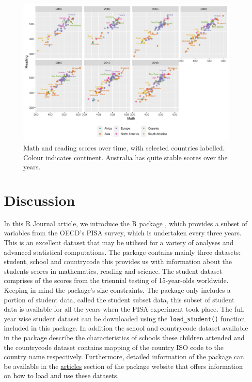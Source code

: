 \begin{Schunk}
\begin{figure}
\includegraphics[width=1\linewidth]{learningtower_files/figure-latex/facet-time-1} \caption[Math and reading scores over time, with selected countries labelled]{Math and reading scores over time, with selected countries labelled. Colour indicates continent. Australia has quite stable scores over the years.}\label{fig:facet-time}
\end{figure}
\end{Schunk}

\hypertarget{discussion}{%
\section{Discussion}\label{discussion}}

In this R Journal article, we introduce the R package
, which provides a subset of variables from the
OECD's PISA survey, which is undertaken every three years. This is an
excellent dataset that may be utilised for a variety of analyses and
advanced statistical computations. The package contains mainly three
datasets: student, school and countrycode this provides us with
information about the students scores in mathematics, reading and
science. The student dataset comprises of the scores from the triennial
testing of 15-year-olds worldwide. Keeping in mind the package's size
constraints. The package only includes a portion of student data, called
the student subset data, this subset of student data is available for
all the years when the PISA experiment took place. The full year wise
student dataset can be downloaded using the \texttt{load\_student()}
function included in this package. In addition the school and
countrycode dataset available in the package describe the
characteristics of schools these children attended and the countrycode
dataset contains mapping of the country ISO code to the country name
respectively. Furthermore, detailed information of the
 package can be available in the
\href{https://kevinwang09.github.io/learningtower/articles/learningtower_school.html}{articles}
section of the package website that offers information on how to load
and use these datasets.

